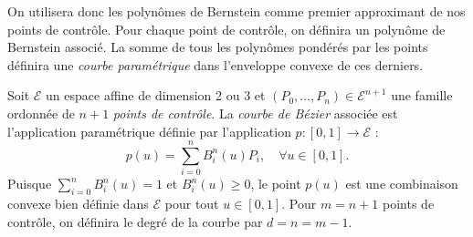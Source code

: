 On utilisera donc les polynômes de Bernstein comme premier approximant de nos points de contrôle. Pour chaque point de contrôle, on définira un polynôme de Bernstein associé. La somme de tous les polynômes pondérés par les points définira une \emph{courbe paramétrique} dans l'enveloppe convexe de ces derniers. 

\begin{definition}
    Soit $\mathcal{E}$ un espace affine de dimension 2 ou 3 et $(P_0, \dots, P_n) \in \mathcal{E}^{n+1}$ une famille ordonnée de $n+1$ \emph{points de contrôle}. La \emph{courbe de Bézier} associée est l'application paramétrique définie par l'application $ p : [0, 1] \longrightarrow \mathcal{E}$ : 
    \begin{equation}
        \boxed{p(u) = \sum_{i=0}^n B_i^n(u) P_i, \quad \forall u \in [0, 1]}.
    \end{equation}
    Puisque $\sum_{i=0}^n B_i^n(u) = 1$ et $B_i^n(u) \geqslant 0$, le point $p(u)$ est une combinaison convexe bien définie dans $\mathcal{E}$ pour tout $u \in [0, 1]$. Pour $ m = n+1$ points de contrôle, on définira le degré de la courbe par $d = n = m-1$. 
\end{definition}

